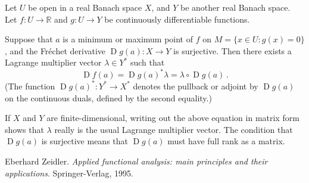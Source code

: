 \documentclass[12pt]{article}
\newcommand{\real}{\mathbb{R}}
\DeclareMathOperator{\D}{D}
\begin{document}
Let $U$ be open in a real Banach space $X$,
and $Y$ be another real Banach space.
Let $f\colon U \to \real$ and $g\colon U \to Y$
be continuously differentiable functions.

Suppose that $a$ is a minimum or maximum point of $f$
on $M = \{ x \in U : g(x) = 0 \}$,
and the Fr\'echet derivative $\D g(a)\colon X \to Y$
is surjective.  Then there exists a Lagrange multiplier vector
$\lambda \in Y^*$
such
that
\[
\D f(a) = \D g(a)^* \lambda = \lambda \circ \D g(a)\,.
\]
(The function $\D g(a)^*\colon Y^* \to X^*$ denotes 
the pullback or adjoint by $\D g(a)$ on the continuous duals,
defined by the second equality.)

If $X$ and $Y$ are finite-dimensional, writing out the above
equation in matrix form shows that $\lambda$ really
is the usual Lagrange multiplier vector. The condition
that $\D g(a)$ is surjective means that $\D g(a)$
must have full rank as a matrix.

\begin{thebibliography}{3}
Eberhard Zeidler. {\it Applied functional analysis: main principles and their applications}. Springer-Verlag, 1995.
\end{thebibliography}
\end{document}
